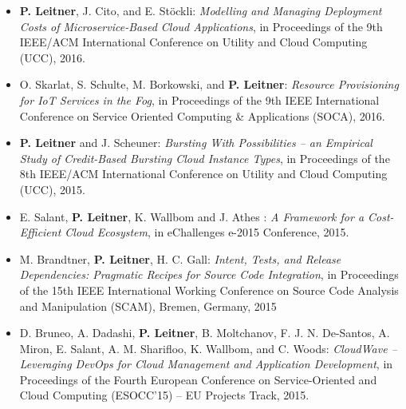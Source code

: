 \documentclass[paper=letter,fontsize=11pt]{scrartcl} %
\begin{document}
\begin{itemize}
\begin{shaded}
    \end{shaded}
	\item \textbf{P. Leitner}, J. Cito, and E. St\"ockli: \emph{Modelling and Managing Deployment Costs of Microservice-Based Cloud Applications}, in Proceedings of the 9th IEEE/ACM International Conference on Utility and Cloud Computing (UCC), 2016.
  \item O. Skarlat, S. Schulte, M. Borkowski, and \textbf{P. Leitner}: \emph{Resource Provisioning for IoT Services in the Fog}, in Proceedings of the 9th IEEE International Conference on Service Oriented Computing \& Applications (SOCA), 2016.
	\item \textbf{P. Leitner} and J. Scheuner: \emph{Bursting With Possibilities -- an Empirical Study of Credit-Based Bursting Cloud Instance Types}, in Proceedings of the 8th IEEE/ACM International Conference on Utility and Cloud Computing (UCC), 2015.
  \item E. Salant, \textbf{P. Leitner}, K. Wallbom and J. Athes : \emph{A Framework for a Cost-Efficient Cloud Ecosystem}, in eChallenges e-2015 Conference, 2015.
  \item M. Brandtner, \textbf{P. Leitner}, H. C. Gall: \emph{Intent, Tests, and Release Dependencies: Pragmatic Recipes for Source Code Integration}, in Proceedings of the 15th IEEE International Working Conference on Source Code Analysis and Manipulation (SCAM), Bremen, Germany, 2015
  \item  D. Bruneo, A. Dadashi, \textbf{P. Leitner}, B. Moltchanov, F. J. N. De-Santos, A. Miron, E. Salant, A. M. Sharifloo, K. Wallbom, and C. Woods: \emph{CloudWave – Leveraging DevOps for Cloud Management and Application Development}, in Proceedings of the Fourth European Conference on Service-Oriented and Cloud Computing (ESOCC’15) – EU Projects Track, 2015.
\end{itemize}
\end{document}
